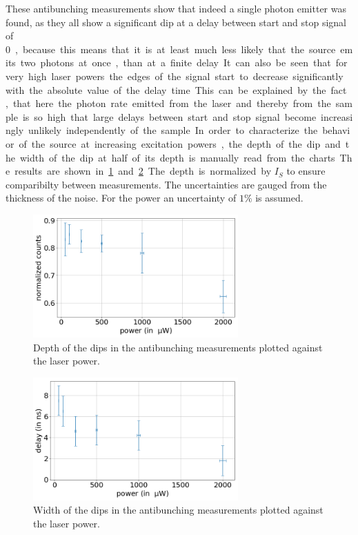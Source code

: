 These antibunching measurements show that indeed a single photon emitter was found, as they all show a significant dip at a delay between start and stop signal of \SI{0}, because this means that it is at least much less likely that the source emits two photons at once, than at a finite delay.
It can also be seen that for very high laser powers the edges of the signal start to decrease significantly with the absolute value of the delay time.
This can be explained by the fact, that here the photon rate emitted from the laser and thereby from the sample is so high that large delays between start and stop signal become increasingly unlikely independently of the sample.

In order to characterize the behavior of the source at increasing excitation powers, the depth of the dip and the width of the dip at half of its depth is manually read from the charts.
The results are shown in \cref{fig_dip_depth} and \cref{fig_dip_width}.
The depth is normalized by $I_S$ to ensure comparibilty between measurements.
The uncertainties are gauged from the thickness of the noise.
For the power an uncertainty of $1\%$ is assumed.

\begin{figure}[H]
    \centering
    \includegraphics[width=0.7\textwidth]{img/output_t2/dip_depth.png}
    \caption{Depth of the dips in the antibunching measurements plotted against the laser power.}
    \label{fig_dip_depth}
\end{figure}

\begin{figure}[H]
    \centering
    \includegraphics[width=0.7\textwidth]{img/output_t2/dip_width.png}
    \caption{Width of the dips in the antibunching measurements plotted against the laser power.}
    \label{fig_dip_width}
\end{figure}

